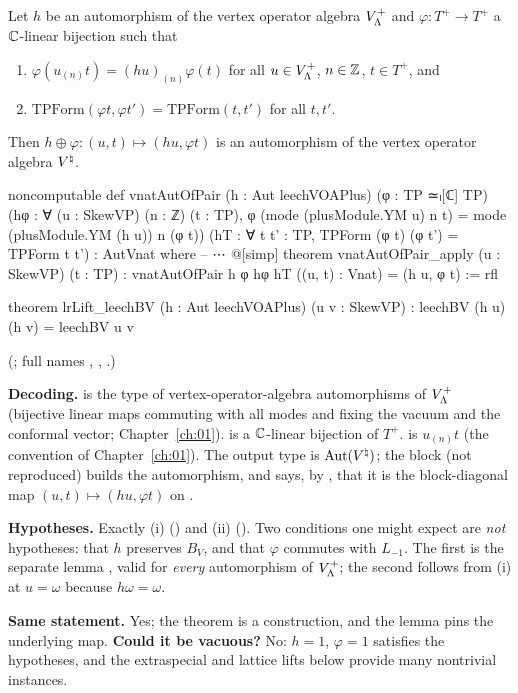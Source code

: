 \begin{theorem}\label{ch22:thm:natural}
Let $h$ be an automorphism of the vertex operator algebra $V_{\Lambda}^+$ and $\varphi:T^+\to T^+$ a ${\mathbb{C}}$-linear
bijection such that
\begin{enumerate}[label=(\roman*)]
\item $\varphi(u_{(n)}t)=(hu)_{(n)}\varphi(t)$ for all $u\in V_{\Lambda}^+$, $n\in{\mathbb{Z}}$, $t\in T^+$, and
\item $\mathrm{TPForm}(\varphi t,\varphi t')=\mathrm{TPForm}(t,t')$ for all $t,t'$.
\end{enumerate}
Then $h\oplus\varphi:(u,t)\mapsto(hu,\varphi t)$ is an automorphism of the vertex operator algebra ${V^{\natural}}$.
\end{theorem}
\begin{leancode}
noncomputable def vnatAutOfPair (h : Aut leechVOAPlus) (φ : TP ≃ₗ[ℂ] TP)
    (hφ : ∀ (u : SkewVP) (n : ℤ) (t : TP),
      φ (mode (plusModule.YM u) n t) = mode (plusModule.YM (h u)) n (φ t))
    (hT : ∀ t t' : TP, TPForm (φ t) (φ t') = TPForm t t') : AutVnat where
-- ⋯
@[simp] theorem vnatAutOfPair_apply (u : SkewVP) (t : TP) :
    vnatAutOfPair h φ hφ hT ((u, t) : Vnat) = (h u, φ t) := rfl
\end{leancode}
\begin{leancode}
theorem lrLift_leechBV (h : Aut leechVOAPlus) (u v : SkewVP) :
    leechBV (h u) (h v) = leechBV u v
\end{leancode}
(; full names ,
, .)
\begin{dictionary}
\textbf{Decoding.}   is the type of vertex-operator-algebra automorphisms of $V_{\Lambda}^+$
(bijective linear maps commuting with all modes and fixing the vacuum and the conformal vector; Chapter~\ref{ch:01}).
 is a ${\mathbb{C}}$-linear bijection of $T^+$.   is $u_{(n)}t$ (the
convention  of Chapter~\ref{ch:01}).  The output type  is $\operatorname{Aut}({V^{\natural}})$; the
 block (not reproduced) builds the automorphism, and  says, by ,
that it is the block-diagonal map $(u,t)\mapsto(hu,\varphi t)$ on .

\textbf{Hypotheses.}  Exactly (i) () and (ii) ().  Two conditions one might expect are \emph{not}
hypotheses: that $h$ preserves $B_V$, and that $\varphi$ commutes with $L_{-1}$.  The first is the separate lemma
, valid for \emph{every} automorphism of $V_{\Lambda}^+$; the second follows from (i) at
$u=\omega$ because $h\omega=\omega$.

\textbf{Same statement.}  Yes; the theorem is a construction, and the  lemma pins the underlying map.
\textbf{Could it be vacuous?}  No: $h=1$, $\varphi=1$ satisfies the hypotheses, and the extraspecial and lattice lifts
below provide many nontrivial instances.
\end{dictionary}
